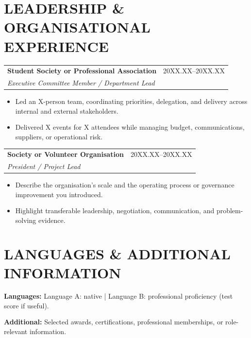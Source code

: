 \documentclass[a4paper,11pt]{article}
\makeatletter
\newcommand{\cvheading}[4]{%
  \par\addvspace{5pt}\noindent\begin{tabularx}{\linewidth}{@{}>{\raggedright\arraybackslash}Xr@{}}
    \textbf{#1} & \color{muted}\small #2 \\
    \textit{#3} & \color{muted}\small #4
  \end{tabularx}\par\vspace{-1pt}}
\newcommand{\cvheadingfirst}[4]{%
  \par\noindent\begin{tabularx}{\linewidth}{@{}>{\raggedright\arraybackslash}Xr@{}}
    \textbf{#1} & \color{muted}\small #2 \\
    \textit{#3} & \color{muted}\small #4
  \end{tabularx}\par\vspace{-1pt}}
\newenvironment{cvitems}{%
  \begin{itemize}[leftmargin=4.6mm,label=\raisebox{0.25ex}{\tiny$\bullet$},itemsep=2pt,topsep=2.2pt,parsep=0pt,partopsep=0pt]\justifying
}{\end{itemize}\vspace{1.5pt}}
\newcommand{\skillline}[2]{\justifying\textbf{#1:} #2\par\vspace{1.5pt}}
\makeatother
\begin{document}
\section{LEADERSHIP \& ORGANISATIONAL EXPERIENCE}
\cvheadingfirst{Student Society or Professional Association}{20XX.XX--20XX.XX}{Executive Committee Member / Department Lead}{ }
\begin{cvitems}
  \item Led an X-person team, coordinating priorities, delegation, and delivery across internal and external stakeholders.
  \item Delivered X events for X attendees while managing budget, communications, suppliers, or operational risk.
\end{cvitems}
\cvheading{Society or Volunteer Organisation}{20XX.XX--20XX.XX}{President / Project Lead}{ }
\begin{cvitems}
  \item Describe the organisation's scale and the operating process or governance improvement you introduced.
  \item Highlight transferable leadership, negotiation, communication, and problem-solving evidence.
\end{cvitems}

\section{LANGUAGES \& ADDITIONAL INFORMATION}
\skillline{Languages}{Language A: native \enspace | \enspace Language B: professional proficiency (test score if useful).}
\skillline{Additional}{Selected awards, certifications, professional memberships, or role-relevant information.}
\end{document}
